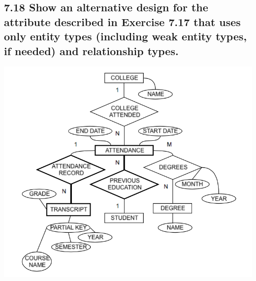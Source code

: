 \begin{figure}[H]
%
\end{figure}

\subsection*{7.18 Show an alternative design for the attribute described in Exercise 7.17 that uses only entity types (including weak entity types, if needed) and relationship types.}
\begin{center}
\includegraphics[width=15cm]{images/7-18.png}
\end{center}

